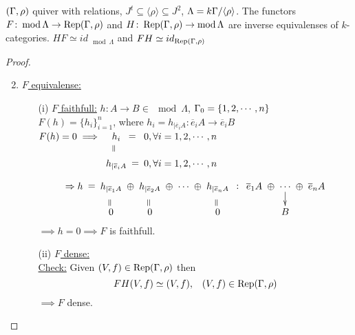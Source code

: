 \begin{thm}
$(\Gamma, \rho)$ quiver with relations, $J^t \subseteq \langle \rho \rangle \subseteq J^2$, $\Lambda = k\Gamma/\langle \rho \rangle$. The functors $F\colon  \operatorname{mod}\nolimits \Lambda \to \operatorname{Rep}(\Gamma, \rho)$ and $H\colon  \operatorname{Rep}(\Gamma, \rho) \to \operatorname{mod}\nolimits \Lambda$ are inverse equivalenses of $k$-categories. $HF \simeq id_{\mod \Lambda}$ and $FH \simeq id_{\operatorname{Rep}(\Gamma, \rho)}$

\begin{proof}
\begin{enumerate}
\item[]
\item \underline{$F$ equivalense:}
\begin{enumerate}
\item[(i)] \underline{$F$ faithfull:} $h\colon A \to B \in \mod \Lambda$, $\Gamma_0 = \{ 1, 2, \cdots , n \}$\\
$F(h) = \{ h_i \}_{i=1}^n$, where $h_i = h_{\mid \overline{e}_iA} \colon  \overline{e}_iA \to \overline{e}_iB$\\
$F(h) = 0 \implies \xymatrix@C-1pc@R-1pc{
h_i \ar@{}[r]|-*[@]{=} & 0, \forall i = 1, 2, \cdots, n\\
h_{\mid \overline{e}_iA} \ar@{}[r]|-*[@]{=} \ar@{}[u]|-*[@]{=} & 0, \forall i = 1, 2, \cdots, n\\
}$\\
\[\xymatrix@C-1pc@R-1pc{
\Rightarrow h \ar@{}[r]|-*[@]{=} & h_{\mid \overline{e}_1A} \ar@{}[d]|-*[@]{=} \ar@{}[r]|-*[@]{\oplus} & h_{\mid \overline{e}_2A} \ar@{}[d]|-*[@]{=} \ar@{}[r]|-*[@]{\oplus}& \cdots \ar@{}[r]|-*[@]{\oplus}& h_{\mid \overline{e}_nA} \ar@{}[d]|-*[@]{=} \ar@{}[r]|-*[@]{:} & \overline{e}_1A \ar@{}[r]|-*[@]{\oplus} & \cdots \ar[d] \ar@{}[r]|-*[@]{\oplus} & \overline{e}_nA\\
              & 0                        & 0                        &        &   0                      &         & B
}\]
$\implies h=0 \implies F$ is faithfull.


\item[(ii)] \underline{$F$ dense:}\\
\underline{Check:} Given $(V, f) \in \operatorname{Rep}(\Gamma, \rho)$ then \[ FH(V, f) \simeq (V, f),\;\;\; (V, f) \in \operatorname{Rep}(\Gamma, \rho) \]
$\implies F$ dense.


\end{enumerate}
\end{enumerate}
\end{proof}
\end{thm}
